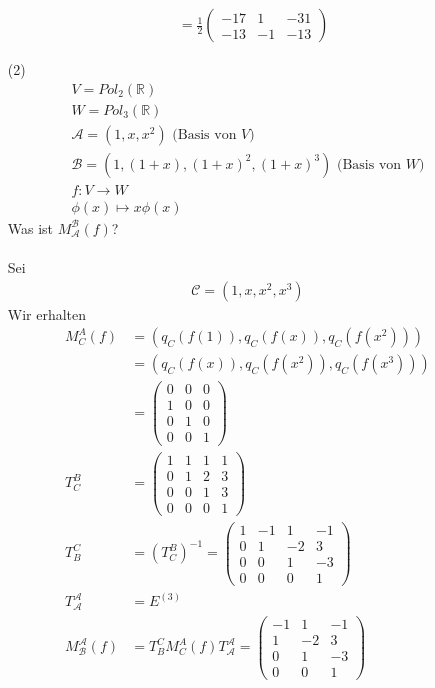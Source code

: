 \documentclass[11pt]{report}
\newcommand*\Zb[1] {\mathbb{#1}}
\begin{document}
\begin{itemize}
\begin{align}
&= \frac{1}{2} \begin{pmatrix} -17 & 1 & -31 \\-13 & -1 & -13\end{pmatrix}
\end{align}

\item[(2)]
\begin{align}
V = Pol_2(\Zb{R}) \\
W = Pol_3(\Zb{R}) \\
\mathcal{A} = (1,x,x^2) \text{ (Basis von $V$)}\\
\mathcal{B} = (1, (1+x), (1+x)^2, (1+x)^3) \text{ (Basis von $W$)}\\
f: V \rightarrow W \\
\phi(x) \mapsto x \phi(x) 
\end{align}
Was ist $M_{\mathcal{A}}^{\mathcal{B}} (f)$? \\\\
Sei 
\begin{align}
 \mathcal{C} = (1, x, x^2, x^3)
\end{align}
Wir erhalten
\begin{align}
M_{C}^{A} (f) &= (q_C(f(1)), q_C(f(x)), q_C(f(x^2))) \\
 &= (q_C(f(x)), q_C(f(x^2)), q_C(f(x^3))) \\
 &= \begin{pmatrix} 0 & 0 & 0 \\ 1 & 0 & 0 \\ 0 & 1 & 0 \\ 0 & 0 & 1 \end{pmatrix} \\
T_{C}^{B} &= \begin{pmatrix} 1 & 1 & 1 & 1 \\ 0 & 1 & 2 & 3 \\ 0 & 0 & 1 & 3 \\ 0 & 0 & 0 & 1 \end{pmatrix} \\
T_{B}^{C} &= \left( T_{C}^{B} \right)^{-1} 
= \begin{pmatrix} 1 & -1 & 1 & -1 \\ 0 & 1 & -2 & 3 \\ 0 & 0 & 1 & -3 \\ 0 & 0 & 0 & 1 \end{pmatrix} \\
T_{\mathcal{A}}^{\mathcal{A}} &= E^{(3)} \\
M_{\mathcal{B}}^{\mathcal{A}} (f) &= T_{B}^{C} M_{C}^{A} (f) T_{\mathcal{A}}^{\mathcal{A}}
= \begin{pmatrix} -1 & 1 & -1 \\ 1 & -2 & 3 \\ 0 & 1 & -3 \\ 0 & 0 & 1 \end{pmatrix} \\
\end{align}


\end{itemize}
\end{document}
